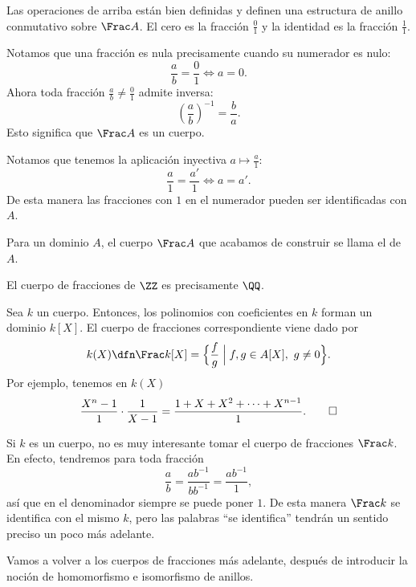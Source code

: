 \begin{observacionejerc}
  Las operaciones de arriba están bien definidas y definen una estructura de
  anillo conmutativo sobre $\Frac A$. El cero es la fracción $\frac{0}{1}$ y
  la identidad es la fracción $\frac{1}{1}$.
\end{observacionejerc}

Notamos que una fracción es nula precisamente cuando su numerador es nulo:
$$\frac{a}{b} = \frac{0}{1} \iff a = 0.$$
Ahora toda fracción $\frac{a}{b} \ne \frac{0}{1}$ admite inversa:
$$\left(\frac{a}{b}\right)^{-1} = \frac{b}{a}.$$
Esto significa que $\Frac A$ es un cuerpo.

Notamos que tenemos la aplicación inyectiva $a \mapsto \frac{a}{1}$:
$$\frac{a}{1} = \frac{a'}{1} \iff a = a'.$$
De esta manera las fracciones con $1$ en el numerador pueden ser identificadas
con $A$.

\begin{definicion}
  Para un dominio $A$, el cuerpo $\Frac A$ que acabamos de construir se llama el
   de $A$.
\end{definicion}

\begin{ejemplo}
  El cuerpo de fracciones de $\ZZ$ es precisamente $\QQ$.
\end{ejemplo}

\begin{ejemplo}
  Sea $k$ un cuerpo. Entonces, los polinomios con coeficientes en $k$ forman un
  dominio $k [X]$. El cuerpo de fracciones correspondiente viene dado por
  $$k (X) \dfn \Frac k[X] = \Bigl\{ \frac{f}{g} \Bigm| f,g \in A [X], ~ g\ne 0 \Bigr\}.$$
  Por ejemplo, tenemos en $k (X)$
  \[ \frac{X^n-1}{1} \cdot \frac{1}{X-1} = \frac{1 + X + X^2 + \cdots + X^{n-1}}{1}. \qedhere \]
\end{ejemplo}

\begin{ejemplo}
  Si $k$ es un cuerpo, no es muy interesante tomar el cuerpo de fracciones
  $\Frac k$. En efecto, tendremos para toda fracción
  $$\frac{a}{b} = \frac{ab^{-1}}{bb^{-1}} = \frac{ab^{-1}}{1},$$
  así que en el denominador siempre se puede poner $1$. De esta manera $\Frac k$
  se identifica con el mismo $k$, pero las palabras ``se identifica'' tendrán un
  sentido preciso un poco más adelante.
\end{ejemplo}

Vamos a volver a los cuerpos de fracciones más adelante, después de introducir
la noción de homomorfismo e isomorfismo de anillos.

